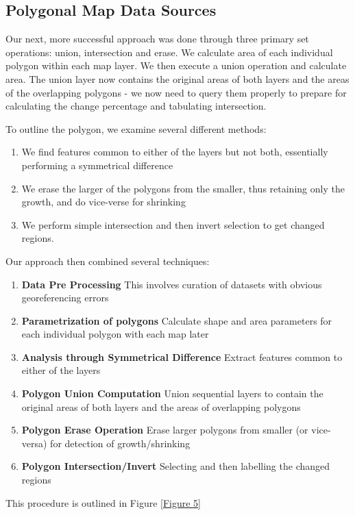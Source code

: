 \documentclass[conference]{IEEEtran}
\begin{document}
\subsection{Polygonal Map Data Sources}


Our next, more successful approach was done through three primary set operations: union, intersection and erase. We calculate area of each individual polygon within each map layer. We then execute a union operation and calculate area. The union layer now contains the original areas of both layers and the areas of the overlapping polygons - we now need to query them properly to prepare for calculating the change percentage and tabulating intersection.

To outline the polygon, we examine several different methods:
\begin{enumerate}
	\item We find features common to either of the layers but not both, essentially performing a symmetrical difference
	\item We erase the larger of the polygons from the smaller, thus retaining only the growth, and do vice-verse for shrinking
	\item We perform simple intersection and then invert selection to get changed regions. 
\end{enumerate}

Our approach then combined several techniques:
\begin{enumerate}
	\item \textbf{Data Pre Processing} This involves curation of datasets with obvious georeferencing errors
	\item \textbf{Parametrization of polygons} Calculate shape and area parameters for each individual polygon with each map later
	\item \textbf{Analysis through Symmetrical Difference} Extract features common to either of the layers
	\item \textbf{Polygon Union Computation} Union sequential layers to contain the original areas of both layers and the areas of overlapping polygons
	\item \textbf{Polygon Erase Operation} Erase larger polygons from smaller (or vice-versa) for detection of growth/shrinking
	\item \textbf{Polygon Intersection/Invert} Selecting and then labelling the changed regions
\end{enumerate}

This procedure is outlined in Figure \ref{Figure 5}
\end{document}
